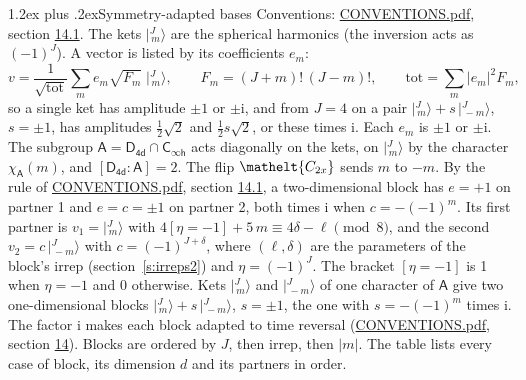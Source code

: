 \documentclass[10pt,a4paper]{article}
\makeatletter
\renewcommand\section{\@startsection{section}{1}{\z@}{-3ex plus -1ex minus -.2ex}%
  {1.2ex plus .2ex}{\normalfont\large\sffamily\bfseries\color{parttitle}}}
\numberwithin{equation}{section}
\newcommand{\eltfont}[1]{{\let\sigma\eltsigma\mathelt{#1}}}
\newcommand{\grp}[1]{\mathsf{#1}}
\newcommand{\elt}[1]{\eltfont{#1}}
\newcommand{\grpindex}[2]{[#1 : #2]}
\newcommand{\iverson}[1]{[#1]}
\newcommand{\iunit}{\mathrm{i}}
\newcommand{\chiA}{\chi_{\grp{A}}}
\newcommand{\jm}[2]{\bigl\lvert{}^{#1}_{\,#2}\bigr\rangle}
\makeatother
\begin{document}
\section{Symmetry-adapted bases}\label{s:bases}
Conventions: \href{../../CONVENTIONS.pdf}{CONVENTIONS.pdf}, section \href{../../CONVENTIONS.pdf\#conv.14.1}{14.1}.
\leavevmode\label{n:index.m}\label{n:vector.ket}The kets $\jm{J}{m}$ are the spherical harmonics (the inversion acts as $(-1)^J$). \label{n:index.ketcoefficient}\label{n:vector.basis.symmetry}\label{n:index.ketweight}\label{n:index.total}A vector is listed by its coefficients $e_m$:
\begin{equation}\label{e:ket}v = \frac{1}{\sqrt{\mathrm{tot}}}\sum_m e_m\sqrt{F_m}\;\jm{J}{m},\qquad F_m = (J+m)!\,(J-m)!,\qquad \mathrm{tot} = \sum_m |e_m|^2F_m,\end{equation}
\leavevmode\label{n:index.pair.sign}so a single ket has amplitude $\pm1$ or $\pm\iunit$, and from $J = 4$ on a pair $\jm{J}{m} + s\,\jm{J}{-m}$, $s = \pm1$, has amplitudes $\tfrac{1}{2}\sqrt{2}$ and $\tfrac{1}{2}s\sqrt{2}$, or these times $\iunit$. Each $e_m$ is $\pm1$ or $\pm\iunit$.
\leavevmode\label{n:group.A}\label{n:function.character.abelian}The subgroup $\grp{A} = \grp{D_{4d}}\cap\grp{C_{\infty h}}$ acts diagonally on the kets, on $\jm{J}{m}$ by the character $\chiA(m)$, and $\grpindex{\grp{D_{4d}}}{\grp{A}} = 2$. The flip $\elt{C_{2x}}$ sends $m$ to $-m$. \label{n:index.partner.sign}By the rule of \href{../../CONVENTIONS.pdf}{CONVENTIONS.pdf}, section \href{../../CONVENTIONS.pdf\#conv.14.1}{14.1}, a two-dimensional block has $e = +1$ on partner 1 and $e = c = \pm1$ on partner 2, both times $\iunit$ when $c = -(-1)^m$. \label{n:index.eta}Its first partner is $v_1 = \jm{J}{m}$ with $4\iverson{\eta = -1} + 5\,m \equiv 4\delta - \ell \pmod{8}$, and the second $v_2 = c\,\jm{J}{-m}$ with $c = (-1)^{J+\delta}$, where $(\ell, \delta)$ are the parameters of the block's irrep (section~\ref{s:irreps2}) and $\eta = (-1)^J$. The bracket $\iverson{\eta = -1}$ is 1 when $\eta = -1$ and 0 otherwise. Kets $\jm{J}{m}$ and $\jm{J}{-m}$ of one character of $\grp{A}$ give two one-dimensional blocks $\jm{J}{m} + s\,\jm{J}{-m}$, $s = \pm1$, the one with $s = -(-1)^m$ times $\iunit$. The factor $\iunit$ makes each block adapted to time reversal (\href{../../CONVENTIONS.pdf}{CONVENTIONS.pdf}, section \href{../../CONVENTIONS.pdf\#conv.14}{14}). Blocks are ordered by $J$, then irrep, then $|m|$.
\leavevmode\label{n:head.case}\label{n:head.partners}The table lists every case of block, its dimension $d$ and its partners in order.
\end{document}
